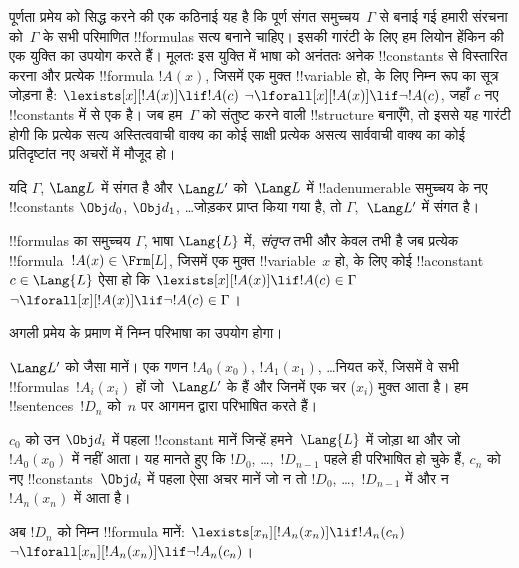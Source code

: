 \documentclass[../../../include/open-logic-section]{subfiles}
\begin{document}


\begin{explain}
पूर्णता प्रमेय को सिद्ध करने की एक कठिनाई यह है कि पूर्ण संगत
समुच्चय~$\Gamma$ से बनाई गई हमारी संरचना को~$\Gamma$ के सभी परिमाणित
!!{formula}s सत्य बनाने चाहिए। इसकी गारंटी के लिए हम लियोन हेंकिन की एक
युक्ति का उपयोग करते हैं। मूलतः इस युक्ति में भाषा को अनंततः अनेक
!!{constant}s से विस्तारित करना और प्रत्येक !!{formula} $!A(x)$, जिसमें एक
मुक्त !!{variable} हो, के लिए निम्न रूप का सूत्र जोड़ना है:
      {$\lexists[x][!A(x)] \lif !A(c)$}
      {$\lnot\lforall[x][!A(x)] \lif \lnot !A(c)$},
जहाँ $c$ नए !!{constant}s में से एक है। जब हम~$\Gamma$ को संतुष्ट करने वाली
!!{structure} बनाएँगे, तो इससे यह गारंटी होगी कि
{प्रत्येक सत्य अस्तित्ववाची वाक्य का कोई साक्षी}
{प्रत्येक असत्य सार्ववाची वाक्य का कोई प्रतिदृष्टांत}
नए अचरों में मौजूद हो।
\end{explain}

\begin{prop}
यदि $\Gamma$, $\Lang L$ में संगत है और $\Lang L'$ को~$\Lang L$ में
!!a{denumerable} समुच्चय के नए !!{constant}s $\Obj d_0$,
$\Obj d_1$, \dots जोड़कर प्राप्त किया गया है, तो $\Gamma$,~$\Lang L'$ में
संगत है।
\end{prop}

\begin{defn}[संतृप्त समुच्चय]
!!{formula}s का समुच्चय $\Gamma$, भाषा $\Lang {L}$ में,
\emph{संतृप्त} तभी और केवल तभी है जब प्रत्येक
!!{formula}~$!A(x) \in \Frm[L]$, जिसमें एक मुक्त !!{variable}~$x$ हो, के
लिए कोई !!a{constant}~$c \in \Lang{L}$ ऐसा हो कि
      {$\lexists[x][!A(x)] \lif !A(c) \in \Gamma$}
      {$\lnot\lforall[x][!A(x)] \lif \lnot !A(c) \in \Gamma$}।
\end{defn}

अगली प्रमेय के प्रमाण में निम्न परिभाषा का उपयोग होगा।

\begin{defn}
$\Lang L'$ को  जैसा मानें। एक गणन
$!A_0(x_0)$, $!A_1(x_1)$, \dots नियत करें, जिसमें वे सभी
!!{formula}s~$!A_i(x_i)$ हों जो~$\Lang L'$ के हैं और जिनमें एक चर ($x_i$)
मुक्त आता है। हम
!!{sentence}s~$!D_n$ को~$n$ पर आगमन द्वारा परिभाषित करते हैं।

$c_0$ को उन $\Obj d_i$ में पहला !!{constant} मानें जिन्हें हमने~$\Lang{L}$
में जोड़ा था और जो~$!A_0(x_0)$ में नहीं आता। यह मानते हुए कि $!D_0$,
\dots,~$!D_{n-1}$ पहले ही परिभाषित
हो चुके हैं, $c_n$ को नए !!{constant}s~$\Obj d_i$ में पहला ऐसा अचर मानें जो
न तो $!D_0$, \dots,~$!D_{n-1}$ में और न~$!A_n(x_n)$ में आता है।

अब $!D_{n}$ को निम्न !!{formula} मानें: 
{$\lexists[x_{n}][!A_{n}(x_{n})] \lif
  !A_{n}(c_{n})$}{$\lnot\lforall[x_{n}][!A_{n}(x_{n})] \lif \lnot
  !A_{n}(c_{n})$}।
\end{defn}
\end{document}
